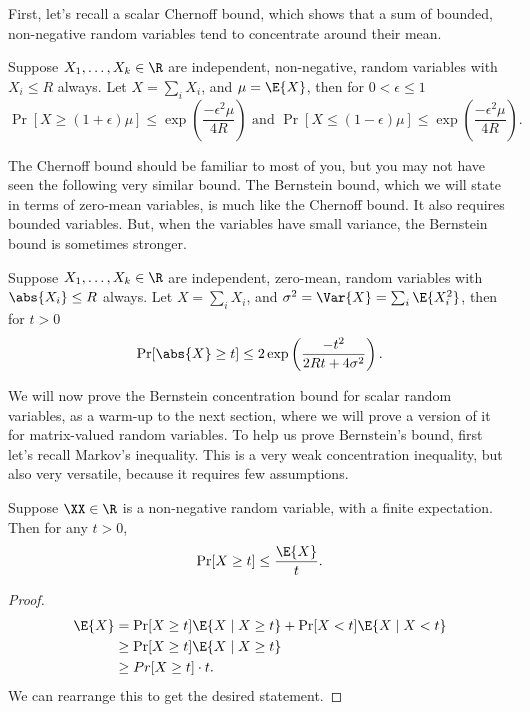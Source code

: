 First, let's recall a scalar Chernoff bound, which shows that a sum of
bounded, non-negative random variables tend to concentrate around
their mean.
\begin{theorem}
Suppose $X_1, \ldots, X_k \in \R$ are independent, non-negative,
random variables with $X_i \leq R$ always.
Let $X = \sum_i X_i$, and $\mu = \E{X}$,
then for $0 < \epsilon \leq 1$
\[
\Pr[ X \geq (1+\epsilon) \mu ] \leq \exp\left(\frac{-\epsilon^2
    \mu}{4R}\right)
\text{ and }
\Pr[ X \leq (1-\epsilon) \mu] \leq \exp\left(\frac{-\epsilon^2
    \mu}{4R}\right)
.
  \]
\end{theorem}
The Chernoff bound should be familiar to most of you, but you may not
have seen the following very similar bound.
The Bernstein bound, which we will state in terms of zero-mean
variables, is much like the Chernoff bound.
It also requires bounded variables.
But, when the variables have small variance, the Bernstein bound is
sometimes stronger.
\begin{theorem}
  \label{thm:bernstein}
  Suppose $X_1, \ldots, X_k \in \R$ are independent, zero-mean,
random variables with $\abs{X_i} \leq R$ always.
Let $X = \sum_i X_i$, and $\sigma^2 = \Var{X} = \sum_i \E{X_i^2}$,
then for $t > 0$
\[
\Pr[ \abs{X} \geq t] \leq 2\exp\left(\frac{-t^2}{2Rt +
    4\sigma^2}\right)
.
  \]
\end{theorem}
We will now prove the Bernstein concentration bound for scalar random
variables, as a warm-up to the next section, where we will prove a version
of it for matrix-valued random variables.
To help us prove Bernstein's bound, first let's recall Markov's
inequality.
This is a very weak concentration inequality, but also very versatile,
because it requires few assumptions.
\begin{lemma}
  \label{lem:markov}
  Suppose $\XX \in \R$ is a non-negative random variable, with a finite
  expectation.
  Then for any $t > 0$,
  \[
    \Pr[ X \geq t] \leq \frac{\E{X}}{t}
    .
    \]
\end{lemma}
\begin{proof}
  \begin{align*}
    \E{X}
    &=
      \Pr[X \geq t]\E{X \mid X \geq t} + \Pr[X < t]\E{X \mid X < t}
   \\
    &\geq \Pr[X \geq t]\E{X \mid X \geq t}
    \\
    &\geq Pr[X \geq t] \cdot t
      .
\end{align*}
  We can rearrange this to get the desired statement.
\end{proof}
